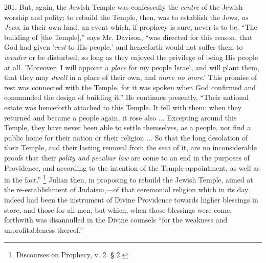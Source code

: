 201.
But, again, the Jewish Temple was confessedly the \emph{centre} of the
Jewish worship and polity; to rebuild the Temple, then, was to
establish the Jews, \emph{as Jews}, in their own land, an event which,
if prophecy is sure, never is to be. ``The building of [the Temple],''
says Mr. Davison, ``was directed for this reason, that God had given '\emph{rest} to His people,' and henceforth would not suffer them to \emph{wander}
or be disturbed; so long as they enjoyed the privilege of being His
people at all. 'Moreover, I will appoint a \emph{place} for my people
Israel, and will plant them, that they may \emph{dwell} in a place
of their own, and \emph{move no more}.' This promise of rest was
connected with the Temple, for it was spoken when God confirmed and
commanded the design of building it.'' He continues presently, ``Their
national estate was henceforth attached to this Temple. It fell with
them; when they returned and became a people again, it rose also ...
Excepting around this Temple, they have never been able to settle
themselves, as a people, nor find a public home for their nation or
their religion ... So that the long desolation of their Temple, and
their lasting removal from the seat of it, are no inconsiderable
proofs that their \emph{polity and peculiar law} are come to an end in
the purposes of Providence, and according to the intention of the
Temple-appointment, as well as in the fact.'' \footnote{Discourses on Prophecy, v. 2. § 2.} Julian then, in proposing to rebuild the Jewish Temple, aimed
at the re-establishment of Judaism,—of that ceremonial religion
which in its day indeed had been the instrument of Divine Providence
towards higher blessings in store, and those for all men, but which,
when those blessings were come, forthwith was disannulled in the
Divine counsels ``for the weakness and unprofitableness thereof.''

